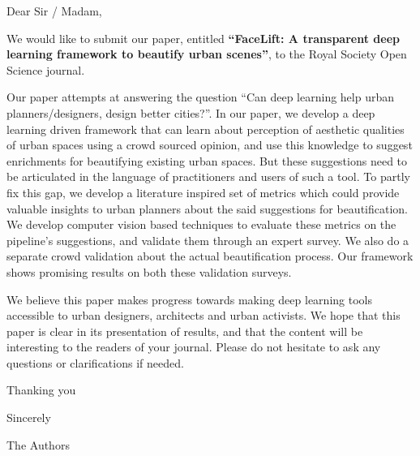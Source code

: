 \documentclass[]{letter}
\begin{document}
Dear Sir / Madam,

We would like to submit our paper, entitled \textbf{``FaceLift: A transparent deep learning framework to beautify urban scenes''}, to the Royal Society Open Science journal.

Our paper attempts at answering the question ``Can deep learning help urban planners/designers, design better cities?''. In our paper, we develop a deep learning driven framework that can learn about perception of aesthetic qualities of urban spaces using a crowd sourced opinion, and use this knowledge to suggest enrichments for beautifying existing urban spaces. 
But these suggestions need to be articulated in the language of practitioners and users of such a tool. To partly fix this gap, we develop a literature inspired set of metrics which could provide valuable insights to urban planners about the said suggestions for beautification. We develop computer vision based techniques to evaluate these metrics on the pipeline's suggestions, and validate them through an expert survey. We also do a separate crowd validation about the actual beautification process. Our framework shows promising results on both these validation surveys.

We believe this paper makes progress towards making deep learning tools accessible to urban designers, architects and urban activists. We hope that this paper is clear in its presentation of results, and that the content will be interesting to the readers of your journal. Please do not hesitate to ask any questions or clarifications if needed.

Thanking you

Sincerely

The Authors
\end{document}
